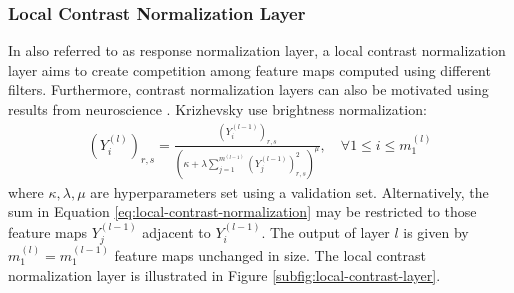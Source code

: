 \subsubsection{Local Contrast Normalization Layer}

In \cite{KrizhevskySutskeverHinton:2012} also referred to as response normalization layer, a local contrast normalization layer aims to create competition among feature maps computed using different filters. Furthermore, contrast normalization layers can also be motivated using results from neuroscience \cite{KrizhevskySutskeverHinton:2012}. Krizhevsky \etal use brightness normalization:
\begin{align}
    \left(Y_i^{(l)}\right)_{r,s} = \frac{\left(Y_i^{(l-1)}\right)_{r,s}}{\left(\kappa + \lambda \sum_{j = 1}^{m^{(l-1)}} \left(Y_j^{(l-1)}\right)^2_{r,s}\right)^\mu},\quad\forall 1 \leq i \leq m_1^{(l)}\label{eq:local-contrast-normalization}
\end{align}
where $\kappa,\lambda,\mu$ are hyperparameters set using a validation set. Alternatively, the sum in Equation \eqref{eq:local-contrast-normalization} may be restricted to those feature maps $Y_j^{(l - 1)}$ adjacent to $Y_i^{(l - 1)}$. The output of layer $l$ is given by $m_1^{(l)} = m_1^{(l-1)}$ feature maps unchanged in size. The local contrast normalization layer is illustrated in Figure \ref{subfig:local-contrast-layer}.

